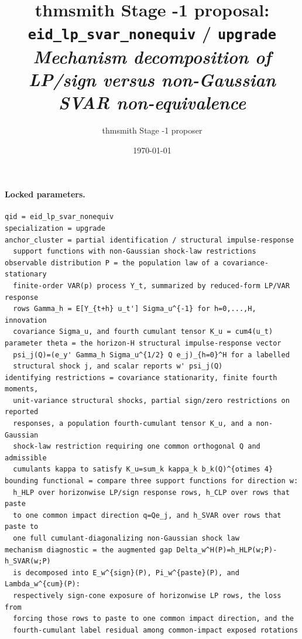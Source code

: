 \documentclass[11pt]{article}
\title{thmsmith Stage -1 proposal: \texttt{eid\_lp\_svar\_nonequiv} / \texttt{upgrade}%
  \\ \large\textit{Mechanism decomposition of LP/sign versus non-Gaussian SVAR non-equivalence}}
\author{thmsmith Stage -1 proposer}
\date{\today}
\theoremstyle{definition}
\theoremstyle{plain}
\theoremstyle{remark}
\begin{document}
\maketitle


\paragraph{Locked parameters.}
\begin{verbatim}
qid = eid_lp_svar_nonequiv
specialization = upgrade
anchor_cluster = partial identification / structural impulse-response
  support functions with non-Gaussian shock-law restrictions
observable distribution P = the population law of a covariance-stationary
  finite-order VAR(p) process Y_t, summarized by reduced-form LP/VAR response
  rows Gamma_h = E[Y_{t+h} u_t'] Sigma_u^{-1} for h=0,...,H, innovation
  covariance Sigma_u, and fourth cumulant tensor K_u = cum4(u_t)
parameter theta = the horizon-H structural impulse-response vector
  psi_j(Q)=(e_y' Gamma_h Sigma_u^{1/2} Q e_j)_{h=0}^H for a labelled
  structural shock j, and scalar reports w' psi_j(Q)
identifying restrictions = covariance stationarity, finite fourth moments,
  unit-variance structural shocks, partial sign/zero restrictions on reported
  responses, a population fourth-cumulant tensor K_u, and a non-Gaussian
  shock-law restriction requiring one common orthogonal Q and admissible
  cumulants kappa to satisfy K_u=sum_k kappa_k b_k(Q)^{otimes 4}
bounding functional = compare three support functions for direction w:
  h_HLP over horizonwise LP/sign response rows, h_CLP over rows that paste
  to one common impact direction q=Qe_j, and h_SVAR over rows that paste to
  one full cumulant-diagonalizing non-Gaussian shock law
mechanism diagnostic = the augmented gap Delta_w^H(P)=h_HLP(w;P)-h_SVAR(w;P)
  is decomposed into E_w^{sign}(P), Pi_w^{paste}(P), and Lambda_w^{cum}(P):
  respectively sign-cone exposure of horizonwise LP rows, the loss from
  forcing those rows to paste to one common impact direction, and the
  fourth-cumulant label residual among common-impact exposed rotations
\end{verbatim}
\end{document}
